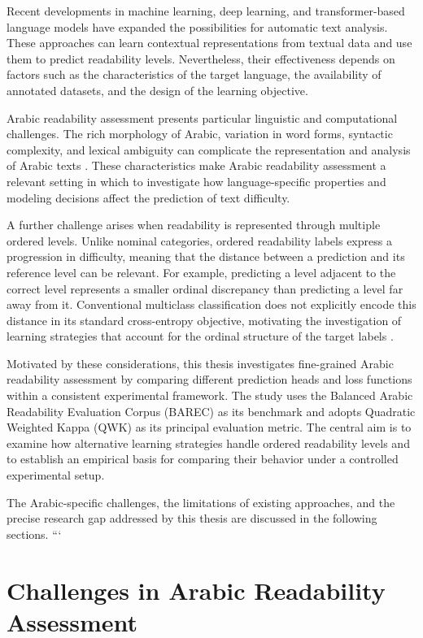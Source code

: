 \documentclass[12pt]{report}
\begin{document}
Recent developments in machine learning, deep learning, and transformer-based language models have expanded the possibilities for automatic text analysis. These approaches can learn contextual representations from textual data and use them to predict readability levels. Nevertheless, their effectiveness depends on factors such as the characteristics of the target language, the availability of annotated datasets, and the design of the learning objective.

Arabic readability assessment presents particular linguistic and computational challenges. The rich morphology of Arabic, variation in word forms, syntactic complexity, and lexical ambiguity can complicate the representation and analysis of Arabic texts \cite{nassiri2023approaches}. These characteristics make Arabic readability assessment a relevant setting in which to investigate how language-specific properties and modeling decisions affect the prediction of text difficulty.

A further challenge arises when readability is represented through multiple ordered levels. Unlike nominal categories, ordered readability labels express a progression in difficulty, meaning that the distance between a prediction and its reference level can be relevant. For example, predicting a level adjacent to the correct level represents a smaller ordinal discrepancy than predicting a level far away from it. Conventional multiclass classification does not explicitly encode this distance in its standard cross-entropy objective, motivating the investigation of learning strategies that account for the ordinal structure of the target labels \cite{castagnos2022ordinal}.

Motivated by these considerations, this thesis investigates fine-grained Arabic readability assessment by comparing different prediction heads and loss functions within a consistent experimental framework. The study uses the Balanced Arabic Readability Evaluation Corpus (BAREC) as its benchmark and adopts Quadratic Weighted Kappa (QWK) as its principal evaluation metric. The central aim is to examine how alternative learning strategies handle ordered readability levels and to establish an empirical basis for comparing their behavior under a controlled experimental setup.

The Arabic-specific challenges, the limitations of existing approaches, and the precise research gap addressed by this thesis are discussed in the following sections.
```
\section{Challenges in Arabic Readability Assessment}
\label{sec:arabic-readability-challenges}
\end{document}
